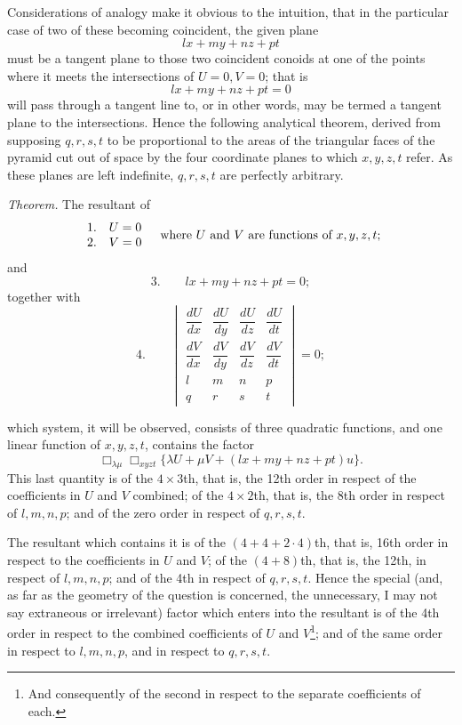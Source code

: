 \documentclass[11pt]{article}
\newcommand{\sourcepage}[1]{\marginpar{\scriptsize p.~#1}}
\begin{document}
Considerations of analogy make it obvious to the intuition, that in the particular case of two of these becoming coincident, the given plane
\[
lx+my+nz+pt
\]
must be a tangent plane to those two coincident conoids at one of the points where it meets the intersections of $U=0,V=0$; that is
\[
lx+my+nz+pt=0
\]
will pass through a tangent line to, or in other words, may be termed a tangent plane to the intersections. Hence the following analytical theorem, derived from supposing $q,r,s,t$ to be proportional to the areas of the triangular faces of the pyramid cut out of space by the four coordinate planes to which $x,y,z,t$ refer. As these planes are left indefinite, $q,r,s,t$ are perfectly arbitrary.

\emph{Theorem.} The resultant of
\[
\begin{array}{ll}
1.&U=0\\
2.&V=0
\end{array}
\quad \hbox{where $U$ and $V$ are functions of $x,y,z,t$;}
\]
and
\[
3.\qquad lx+my+nz+pt=0;
\]
together with
\[
4.\qquad
\begin{vmatrix}
\dfrac{dU}{dx}&\dfrac{dU}{dy}&\dfrac{dU}{dz}&\dfrac{dU}{dt}\\[0.6em]
\dfrac{dV}{dx}&\dfrac{dV}{dy}&\dfrac{dV}{dz}&\dfrac{dV}{dt}\\[0.6em]
l&m&n&p\\
q&r&s&t
\end{vmatrix}=0;
\]

\sourcepage{143}
which system, it will be observed, consists of three quadratic functions, and one linear function of $x,y,z,t$, contains the factor
\[
\Box_{\lambda\mu}\Box_{xyzt}\{\lambda U+\mu V+(lx+my+nz+pt)u\}.
\]
This last quantity is of the $4\times3$th, that is, the 12th order in respect of the coefficients in $U$ and $V$ combined; of the $4\times2$th, that is, the 8th order in respect of $l,m,n,p$; and of the zero order in respect of $q,r,s,t$.

The resultant which contains it is of the $(4+4+2\cdot4)$th, that is, 16th order in respect to the coefficients in $U$ and $V$; of the $(4+8)$th, that is, the 12th, in respect of $l,m,n,p$; and of the 4th in respect of $q,r,s,t$. Hence the special (and, as far as the geometry of the question is concerned, the unnecessary, I may not say extraneous or irrelevant) factor which enters into the resultant is of the 4th order in respect to the combined coefficients of $U$ and $V$\footnote{And consequently of the second in respect to the separate coefficients of each.}; and of the same order in respect to $l,m,n,p$, and in respect to $q,r,s,t$.
\end{document}
